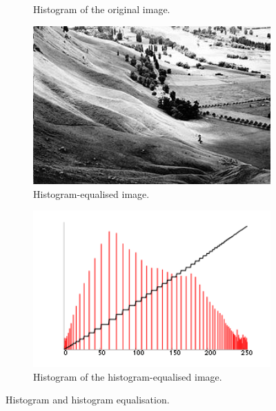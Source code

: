\documentclass[12pt, conference]{IEEEtran}
\begin{document}
\begin{figure}[htbp]
\begin{subfigure}{0.4\textwidth}
        \caption{Histogram of the original image.}
        \label{C original histogram}
    \end{subfigure}
    \begin{subfigure}{0.4\textwidth}
        \centering
        \includegraphics[width=1\textwidth]{Images/C equalised.jpg}
        \caption{Histogram-equalised image.}
        \label{C equalised}
    \end{subfigure}
    \begin{subfigure}{0.4\textwidth}
        \centering
        \includegraphics[width=1\textwidth]{Images/C equalised histogram.png}
        \caption{Histogram of the histogram-equalised image.}
        \label{C equalised histogram}
    \end{subfigure}
    \caption{Histogram and histogram equalisation.}
    \label{Histogram and histogram equalisation}
\end{figure}
\end{document}
